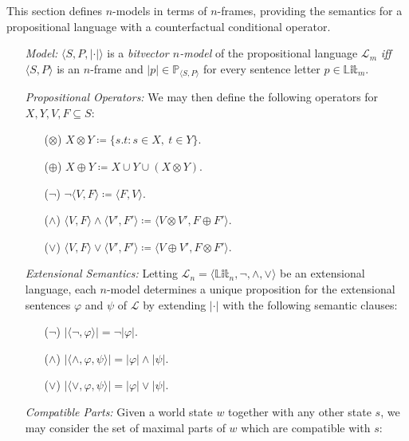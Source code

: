 \documentclass[a4paper, 11pt]{article} %
\newcommand{\tuple}[1]{\langle#1\rangle} %
\newcommand{\set}[1]{\lbrace#1\rbrace} %
\renewcommand{\P}[0]{\mathbb{P}}
\newcommand{\Lit}[0]{\mathbb{Lit}}
\renewcommand{\L}[0]{\mathcal{L}}
\renewcommand{\Vert}[1]{\ldbrack#1\rdbrack}
\renewcommand{\vert}[1]{\lvert#1\rvert}
\begin{document}
This section defines $n$-models in terms of $n$-frames, providing the semantics for a propositional language with a counterfactual conditional operator.

\begin{enumerate}
  \item[\it Model:] $\tuple{S,P,\vert{\cdot}}$ is a \textit{bitvector $n$-model} of the propositional language $\L_m$ \textit{iff} $\tuple{S,P}$ is an $n$-frame and $\vert{p}\in\P_{\tuple{S,P}}$ for every sentence letter $p\in\Lit_m$.
  \item[\it Propositional Operators:] We may then define the following operators for $X,Y,V,F\subseteq S$:
    \begin{itemize}
      \item[($\otimes$)] $X \otimes Y \coloneq \set{s.t : s \in X,\ t \in Y}$.
      \item[($\oplus$)] $X \oplus Y \coloneq X \cup Y \cup (X \otimes Y)$.
      \item[($\neg$)] $\neg\tuple{V,F} \coloneq \tuple{F,V}$.
      \item[($\wedge$)] $\tuple{V,F}\wedge\tuple{V',F'} \coloneq \tuple{V\otimes V',F\oplus F'}$.
      \item[($\vee$)] $\tuple{V,F}\vee\tuple{V',F'} \coloneq \tuple{V\oplus V',F\otimes F'}$.
    \end{itemize}
  \item[\it Extensional Semantics:] Letting $\L_n=\tuple{\Lit_n,\neg,\wedge,\vee}$ be an extensional language, each $n$-model determines a unique proposition for the extensional sentences $\varphi$ and $\psi$ of $\L$ by extending $\vert{\cdot}$ with the following semantic clauses: 
    \begin{itemize}
      \item[($\neg$)] $\vert{\tuple{\neg,\varphi}}=\neg\vert{\varphi}$.
      \item[($\wedge$)] $\vert{\tuple{\wedge,\varphi,\psi}}=\vert{\varphi}\wedge\vert{\psi}$.
      \item[($\vee$)] $\vert{\tuple{\vee,\varphi,\psi}}=\vert{\varphi}\vee\vert{\psi}$.
    \end{itemize}
  \item[\it Compatible Parts:] Given a world state $w$ together with any other state $s$, we may consider the set of maximal parts of $w$ which are compatible with $s$:\\ 

\end{enumerate}
\end{document}
